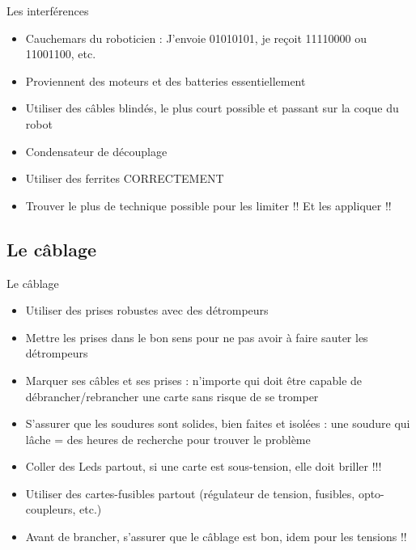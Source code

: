 \documentclass{beamer}
\begin{document}
\begin{frame}{Les interférences}
	\begin{itemize}
		\item Cauchemars du roboticien : J'envoie 01010101, je reçoit 11110000 ou 11001100, etc.
		\item Proviennent des moteurs et des batteries essentiellement
		\item Utiliser des câbles blindés, le plus court possible et passant sur la coque du robot
		\item Condensateur de découplage
		\item Utiliser des ferrites CORRECTEMENT
		\item Trouver le plus de technique possible pour les limiter !! Et les appliquer !!
	\end{itemize}
\end{frame}

\subsection{Le câblage}
\begin{frame}{Le câblage}
	\begin{itemize}
		\item Utiliser des prises robustes avec des détrompeurs
		\item Mettre les prises dans le bon sens pour ne pas avoir à faire sauter les détrompeurs
		\item Marquer ses câbles et ses prises : n'importe qui doit être capable de débrancher/rebrancher une carte sans risque de se tromper
		\item S'assurer que les soudures sont solides, bien faites et isolées : une soudure qui lâche = des heures de recherche pour trouver le problème
		\item Coller des Leds partout, si une carte est sous-tension, elle doit briller !!!
		\item Utiliser des cartes-fusibles partout (régulateur de tension, fusibles, opto-coupleurs, etc.)
		\item Avant de brancher, s'assurer que le câblage est bon, idem pour les tensions !!
	\end{itemize}
\end{frame}
\end{document}

